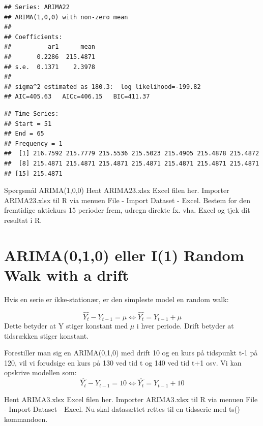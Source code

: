 \documentclass[]{book}
\newenvironment{Shaded}{\begin{snugshade}}{\end{snugshade}}
\newcommand{\DataTypeTok}[1]{\textcolor[rgb]{0.13,0.29,0.53}{#1}}
\newcommand{\DecValTok}[1]{\textcolor[rgb]{0.00,0.00,0.81}{#1}}
\newcommand{\KeywordTok}[1]{\textcolor[rgb]{0.13,0.29,0.53}{\textbf{#1}}}
\newcommand{\NormalTok}[1]{#1}
\newcommand{\OperatorTok}[1]{\textcolor[rgb]{0.81,0.36,0.00}{\textbf{#1}}}
\begin{document}
\begin{verbatim}
## Series: ARIMA22 
## ARIMA(1,0,0) with non-zero mean 
## 
## Coefficients:
##          ar1      mean
##       0.2286  215.4871
## s.e.  0.1371    2.3978
## 
## sigma^2 estimated as 180.3:  log likelihood=-199.82
## AIC=405.63   AICc=406.15   BIC=411.37
\end{verbatim}

\begin{Shaded}
\end{Shaded}

\begin{verbatim}
## Time Series:
## Start = 51 
## End = 65 
## Frequency = 1 
##  [1] 216.7592 215.7779 215.5536 215.5023 215.4905 215.4878 215.4872
##  [8] 215.4871 215.4871 215.4871 215.4871 215.4871 215.4871 215.4871
## [15] 215.4871
\end{verbatim}

Spørgsmål ARIMA(1,0,0)
Hent ARIMA23.xlsx Excel filen her. Importer ARIMA23.xlsx til R via menuen File - Import Dataset - Excel. Bestem for den fremtidige aktiekurs 15 perioder frem, udregn direkte fx. vha. Excel og tjek dit resultat i R.

\hypertarget{arima010-eller-i1-random-walk-with-a-drift}{%
\section{ARIMA(0,1,0) eller I(1) Random Walk with a drift}\label{arima010-eller-i1-random-walk-with-a-drift}}

Hvis en serie er ikke-stationær, er den simpleste model en random walk:

\[\hat{Y_t}-Y_{t-1}=\mu\Leftrightarrow \hat{Y_t}=Y_{t-1}+\mu\]
Dette betyder at Y stiger konstant med \(\mu\) i hver periode. Drift betyder at tidsrækken stiger konstant.

Forestiller man sig en ARIMA(0,1,0) med drift 10 og en kurs på tidspunkt t-1 på 120, vil vi forudsige en kurs på 130 ved tid t og 140 ved tid t+1 osv. Vi kan opskrive modellen som:
\[\hat{Y_t}-Y_{t-1}=10\Leftrightarrow \hat{Y_t}=Y_{t-1}+10\]

Hent ARIMA3.xlsx Excel filen her. Importer ARIMA3.xlsx til R via menuen File - Import Dataset - Excel. Nu skal datasættet rettes til en tidsserie med ts() kommandoen.
\end{document}
